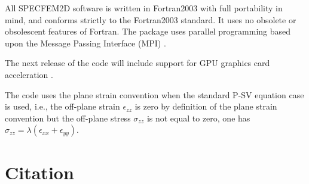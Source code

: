 \documentclass[oneside,english,onecolumn,letterpaper]{book}
\begin{document}
All SPECFEM2D software is written in Fortran2003 with full portability
in mind, and conforms strictly to the Fortran2003 standard. It uses
no obsolete or obsolescent features of Fortran. The package uses
parallel programming based upon the Message Passing Interface (MPI)
\citep{GrLuSk94,Pac97}.

The next release of the code will include support for GPU graphics card acceleration \citep{KoMiEr09,KoErGoMi10,MiKo10,Kom11}.

The code uses the plane strain convention when the standard P-SV equation case is used, i.e.,
the off-plane strain $\epsilon_{zz}$ is zero by definition of the plane strain convention but the off-plane stress $\sigma_{zz}$ is not equal to zero,
one has $\sigma_{zz} = \lambda (\epsilon_{xx} + \epsilon_{yy})$.

\section{Citation}
\end{document}

